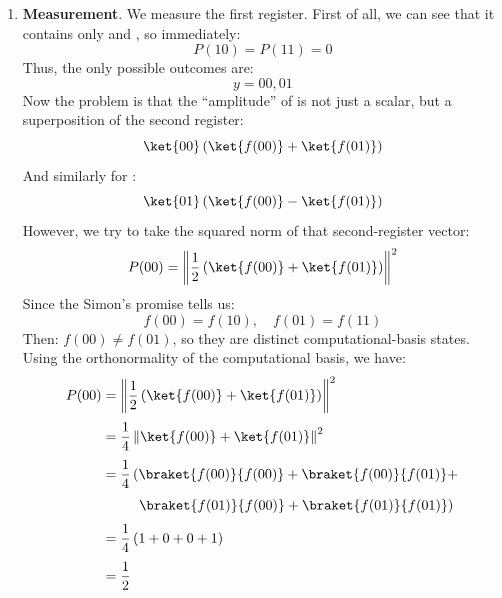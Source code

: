 \begin{enumerate}[label={\textbf{Step \arabic*.}}, leftmargin=2cm]
    \item \textbf{Measurement}. We measure the first register. First of all, we can see that it contains only  and , so immediately:
        \begin{equation*}
            P(10) = P(11) = 0
        \end{equation*}
        Thus, the only possible outcomes are:
        \begin{equation*}
            y = 00, 01
        \end{equation*}
        Now the problem is that the ``amplitude'' of  is not just a scalar, but a superposition of the second register:
        \begin{equation*}
            \ket{00} \left(\ket{f(00)} + \ket{f(01)}\right)
        \end{equation*}
        And similarly for :
        \begin{equation*}
            \ket{01} \left(\ket{f(00)} - \ket{f(01)}\right)
        \end{equation*}
        However, we try to take the squared norm of that second-register vector:
        \begin{equation*}
            P(00) = \left\|\frac{1}{2} \left(\ket{f(00)} + \ket{f(01)}\right)\right\|^2
        \end{equation*}
        Since the Simon's promise tells us:
        \begin{equation*}
            f(00) = f(10), \quad f(01) = f(11)
        \end{equation*}
        Then: $f(00) \neq f(01)$, so they are distinct computational-basis states. Using the orthonormality of the computational basis, we have:
        \begin{align*}
            P(00) &= \left\|\frac{1}{2} \left(\ket{f(00)} + \ket{f(01)}\right)\right\|^2 \\[.3em]
            &= \frac{1}{4} \left\|\ket{f(00)} + \ket{f(01)}\right\|^2 \\[.3em]
            &= \frac{1}{4} \left(
                \braket{f(00)}{f(00)} + \braket{f(00)}{f(01)} + \right. \\[.3em]
                &\quad\;\;\;\;\; \left.
                \braket{f(01)}{f(00)} + \braket{f(01)}{f(01)}
            \right) \\[.3em]
            &= \frac{1}{4} \left(
                1 + 0 + 0 + 1
            \right) \\[.3em]
            &= \frac{1}{2}
        \end{align*}

\end{enumerate}
